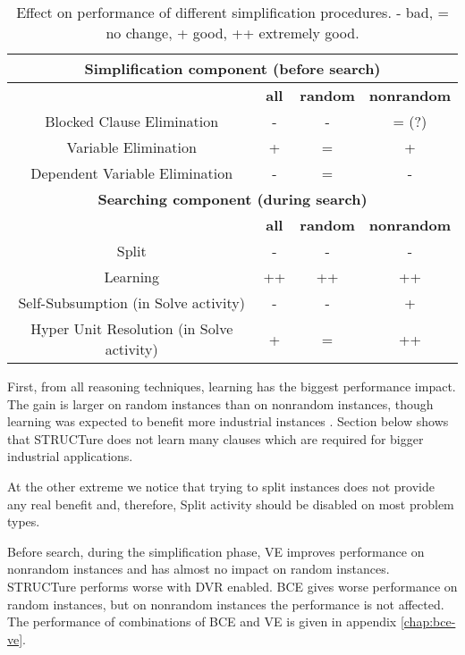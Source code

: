 \begin{table}
  \centering
  \begin{tabular}{| c | c | c | c |}
    \hline
    \multicolumn{4}{|c|}{\textbf{Simplification component (before search)}} \\
    \hline
    & \textbf{all} & \textbf{random} & \textbf{nonrandom} \\
    \hline
    Blocked Clause Elimination & - & - & = (?) \\
    Variable Elimination & + & = & + \\
    Dependent Variable Elimination & - & = & - \\
    \hline
    \hline
    \multicolumn{4}{|c|}{\textbf{Searching component (during search)}} \\
    \hline
    & \textbf{all} & \textbf{random} & \textbf{nonrandom} \\
    \hline
    Split & - & - & - \\
    Learning & ++ & ++ & ++ \\
    Self-Subsumption (in Solve activity) & - & - & + \\
    Hyper Unit Resolution (in Solve activity) & + & = & ++ \\
    \hline
  \end{tabular}

  \caption{Effect on performance of different simplification procedures.
  - bad, = no change, + good, ++ extremely good.}
  \label{tbl:disable}
\end{table}

First, from all reasoning techniques, learning has the biggest
performance impact. The gain is larger on random instances than on
nonrandom instances, though learning was expected to benefit more
industrial instances \cite{DBLP:series/faia/SilvaLM09}. Section
below shows that STRUCTure does not learn many clauses which are
required for bigger industrial applications.

At the other extreme we notice that trying to split instances does not
provide any real benefit and, therefore, Split activity should be disabled
on most problem types.

Before search, during the simplification phase, VE improves
performance on nonrandom instances and has almost no impact on random
instances. STRUCTure performs worse with DVR enabled. BCE gives
worse performance on random instances, but on nonrandom instances
the performance is not affected.  The performance of combinations
of BCE and VE is given in appendix \ref{chap:bce-ve}.

